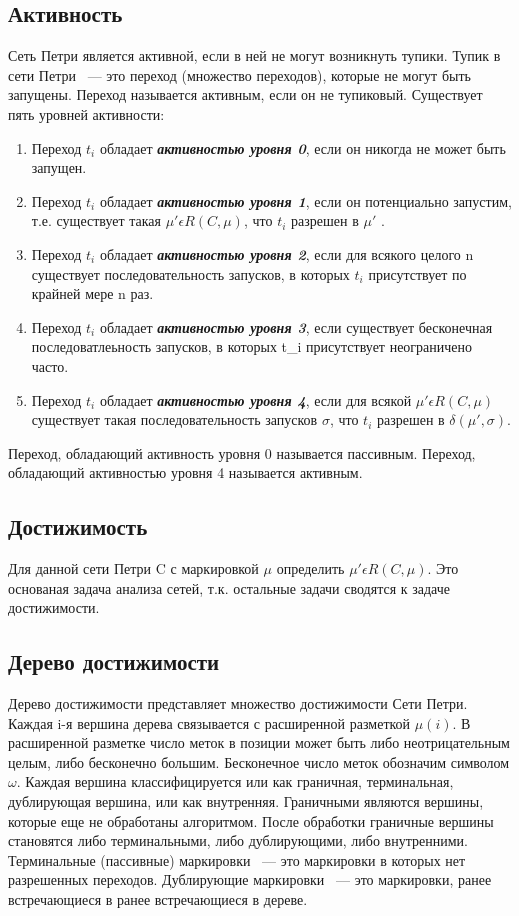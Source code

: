 \subsection*{Активность}
Сеть Петри является активной, если в ней не могут возникнуть тупики. Тупик в сети Петри ~--- это переход (множество переходов), которые не могут быть запущены. Переход называется активным, если он не тупиковый. Существует пять уровней активности:
\begin{enumerate}
\item Переход $ t_{i} $ обладает \textbf{\textit{активностью уровня 0}}, если он никогда не может быть запущен.
\item Переход $ t_{i} $ обладает \textbf{\textit{активностью уровня 1}}, если он потенциально запустим, т.е. существует такая $ \mu' \epsilon R(C, \mu) $, что $ t_{i} $ разрешен в $ \mu' $ .
\item Переход $ t_{i} $ обладает \textbf{\textit{активностью уровня 2}}, если для всякого целого n существует последовательность запусков, в которых $ t_{i} $ присутствует по крайней мере n раз.
\item Переход $ t_{i} $ обладает \textbf{\textit{активностью уровня 3}}, если существует бесконечная последоватлеьность запусков, в которых t_{i} присутствует неограничено часто.
\item Переход $ t_{i} $ обладает \textbf{\textit{активностью уровня 4}}, если для всякой $ \mu' \epsilon R(C, \mu) $ существует такая последовательность запусков $\sigma $, что $ t_{i} $ разрешен в $ \delta(\mu', \sigma) $.
\end{enumerate}

Переход, обладающий активность уровня 0 называется пассивным. Переход, обладающий активностью уровня 4 называется активным.

\subsection*{Достижимость}
Для данной сети Петри C с маркировкой $ \mu $ определить $ \mu' \epsilon R(C, \mu) $. Это основаная задача анализа сетей, т.к. остальные задачи сводятся к задаче достижимости.

\subsection{Дерево достижимости}

Дерево достижимости представляет множество достижимости Сети Петри. Каждая i-я вершина дерева связывается с расширенной разметкой $ \mu(i) $. В расширенной разметке число меток в позиции может быть либо неотрицательным целым, либо бесконечно большим. Бесконечное число меток обозначим символом $ \omega $. Каждая вершина классифицируется или как граничная, терминальная, дублирующая вершина, или как внутренняя. Граничными являются вершины, которые еще не обработаны алгоритмом. После обработки граничные вершины становятся либо терминальными, либо дублирующими, либо внутренними. Терминальные (пассивные) маркировки ~--- это маркировки в которых нет разрешенных переходов. Дублирующие маркировки ~--– это маркировки, ранее встречающиеся в ранее встречающиеся в дереве.

